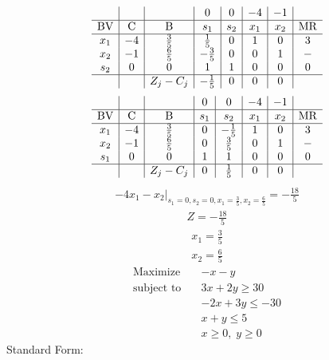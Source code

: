 \documentclass{article}
\begin{document}
\begin{align*}
\begin{array}{c|c|c|c|c|c|c|c}
 &  &  & 0 & 0 & -4 & -1 & \\
\hline
\text{BV} & \text{C} & \text{B} & s_{1} & s_{2} & x_{1} & x_{2} & \text{MR} \\
\hline
x_{1} & -4 & \frac{3}{5} & \frac{1}{5} & 0 & 1 & 0 & 3 \\
x_{2} & -1 & \frac{6}{5} & -\frac{3}{5} & 0 & 0 & 1 & - \\
s_{2} & 0 & 0 & 1 & 1 & 0 & 0 & 0 \\
\hline
 &  & Z_j-C_j & -\frac{1}{5} & 0 & 0 & 0 & \\
\end{array}
\end{align*}
\begin{align*}
\begin{array}{c|c|c|c|c|c|c|c}
 &  &  & 0 & 0 & -4 & -1 & \\
\hline
\text{BV} & \text{C} & \text{B} & s_{1} & s_{2} & x_{1} & x_{2} & \text{MR} \\
\hline
x_{1} & -4 & \frac{3}{5} & 0 & -\frac{1}{5} & 1 & 0 & 3 \\
x_{2} & -1 & \frac{6}{5} & 0 & \frac{3}{5} & 0 & 1 & - \\
s_{1} & 0 & 0 & 1 & 1 & 0 & 0 & 0 \\
\hline
 &  & Z_j-C_j & 0 & \frac{1}{5} & 0 & 0 & \\
\end{array}
\end{align*}
\begin{align*}
\left.-4x_{1} - x_{2}\right|_{s_{1}=0,s_{2}=0,x_{1}=\frac{3}{5},x_{2}=\frac{6}{5}}=-\frac{18}{5}\end{align*}
\begin{align*}
Z=-\frac{18}{5}\end{align*}
\begin{align*}
x_{1}=\frac{3}{5}\end{align*}
\begin{align*}
x_{2}=\frac{6}{5}\end{align*}
\begin{align*}
\text{Maximize} \quad & -x - y\\
\text{subject to} \quad
& 3x + 2y\ge30\\
& -2x + 3y\le-30\\
& x + y\le5\\
& x\ge0,\; y\ge0\end{align*}
Standard Form:\\
\end{document}
